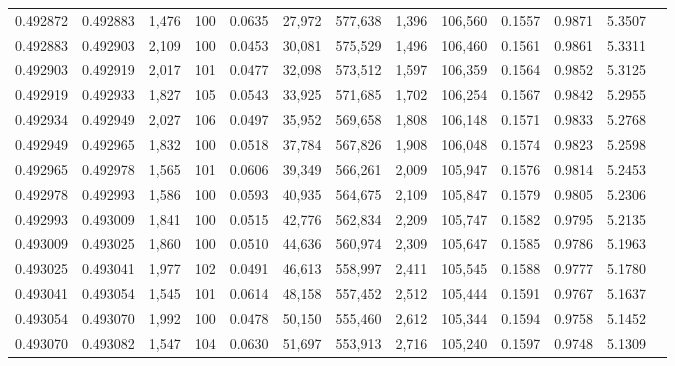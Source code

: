 \begin{tabular}{rrrrrrrrrrrrr}
0.492872 & 0.492883 & 1,476 & 100 &                                     0.0635 &  27,972 & 577,638 &   1,396 & 106,560 & 0.1557 & 0.9871 & 5.3507 \\
0.492883 & 0.492903 & 2,109 & 100 &                                     0.0453 &  30,081 & 575,529 &   1,496 & 106,460 & 0.1561 & 0.9861 & 5.3311 \\
0.492903 & 0.492919 & 2,017 & 101 &                                     0.0477 &  32,098 & 573,512 &   1,597 & 106,359 & 0.1564 & 0.9852 & 5.3125 \\
0.492919 & 0.492933 & 1,827 & 105 &                                     0.0543 &  33,925 & 571,685 &   1,702 & 106,254 & 0.1567 & 0.9842 & 5.2955 \\
0.492934 & 0.492949 & 2,027 & 106 &                                     0.0497 &  35,952 & 569,658 &   1,808 & 106,148 & 0.1571 & 0.9833 & 5.2768 \\
0.492949 & 0.492965 & 1,832 & 100 &                                     0.0518 &  37,784 & 567,826 &   1,908 & 106,048 & 0.1574 & 0.9823 & 5.2598 \\
0.492965 & 0.492978 & 1,565 & 101 &                                     0.0606 &  39,349 & 566,261 &   2,009 & 105,947 & 0.1576 & 0.9814 & 5.2453 \\
0.492978 & 0.492993 & 1,586 & 100 &                                     0.0593 &  40,935 & 564,675 &   2,109 & 105,847 & 0.1579 & 0.9805 & 5.2306 \\
0.492993 & 0.493009 & 1,841 & 100 &                                     0.0515 &  42,776 & 562,834 &   2,209 & 105,747 & 0.1582 & 0.9795 & 5.2135 \\
0.493009 & 0.493025 & 1,860 & 100 &                                     0.0510 &  44,636 & 560,974 &   2,309 & 105,647 & 0.1585 & 0.9786 & 5.1963 \\
0.493025 & 0.493041 & 1,977 & 102 &                                     0.0491 &  46,613 & 558,997 &   2,411 & 105,545 & 0.1588 & 0.9777 & 5.1780 \\
0.493041 & 0.493054 & 1,545 & 101 &                                     0.0614 &  48,158 & 557,452 &   2,512 & 105,444 & 0.1591 & 0.9767 & 5.1637 \\
0.493054 & 0.493070 & 1,992 & 100 &                                     0.0478 &  50,150 & 555,460 &   2,612 & 105,344 & 0.1594 & 0.9758 & 5.1452 \\
0.493070 & 0.493082 & 1,547 & 104 &                                     0.0630 &  51,697 & 553,913 &   2,716 & 105,240 & 0.1597 & 0.9748 & 5.1309 \\

\end{tabular}
